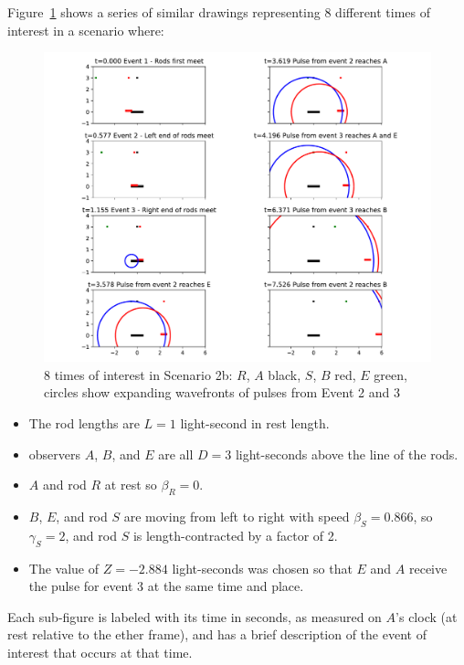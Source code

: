 \documentclass[a4paper]{article}
\theoremstyle{plain}
\theoremstyle{definition}
\begin{document}
Figure~\ref{fig:eight-times-of-interest-in-scenario-2b} shows a series
of similar drawings representing 8 different times of interest in a
scenario where:
\begin{figure}[ht]
	\centering
	\includegraphics[width=1.0\textwidth]{scen2b-L-1.0-D-3.0-beta_S-0.866-cropped.pdf}
	\caption{8 times of interest in Scenario 2b: $R$, $A$ black, $S$, $B$ red, $E$ green, circles show expanding wavefronts of pulses from Event 2 and 3}
	\label{fig:eight-times-of-interest-in-scenario-2b}
\end{figure}
\begin{itemize}
\item The rod lengths are $L=1$ light-second in rest length.
\item observers $A$, $B$, and $E$ are all $D=3$ light-seconds above
  the line of the rods.
\item $A$ and rod $R$ at rest so $\beta_R=0$.
\item $B$, $E$, and rod $S$ are moving from left to right with speed
  $\beta_S=0.866$, so $\gamma_S=2$, and rod $S$ is length-contracted
  by a factor of 2.
\item The value of $Z=-2.884$ light-seconds was chosen so that $E$ and
  $A$ receive the pulse for event 3 at the same time and place.
\end{itemize}
Each sub-figure is labeled with its time in seconds, as measured on
$A$'s clock (at rest relative to the ether frame), and has a brief
description of the event of interest that occurs at that time.
\end{document}
